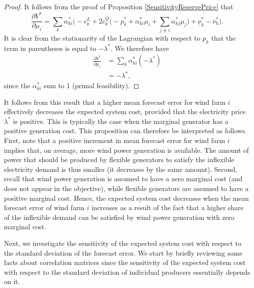 \documentclass{article}
\begin{document}
\begin{proof}
It follows from the proof of Proposition \ref{SensitivityReservePrice} that 
\begin{equation*}
\frac{\partial V^*}{\partial \mu_i} = \sum_k \alpha_{ki}^* \Big(-c_k^L + 2 c_k^Q \big(- p_k^* + \alpha_{ki}^* \mu_i + \sum_{j \ne i} \alpha_{kj}^* \mu_j\big) + \underline{\nu}_k^* - \overline{\nu}_k^*\Big).
\end{equation*}
It is clear from the stationarity of the Lagrangian with respect to $p_k$ that the term in parentheses is equal to $-\lambda^*$. We therefore have
\begin{align*}
\frac{\partial V^*}{\partial \mu_i} &= \sum_k \alpha_{ki}^* (-\lambda^*)\\
&= -\lambda^*,
\end{align*}
since the $\alpha_{ki}^*$ sum to 1 (primal feasibility).
\end{proof}

It follows from this result that a higher mean forecast error for wind farm $i$ effectively decreases the expected system cost, provided that the electricity price $\lambda^*$ is positive. This is typically the case when the marginal generator has a positive generation cost. This proposition can therefore be interpreted as follows. First, note that a positive increment in mean forecast error for wind farm $i$ implies that, on average, more wind power generation is available. The amount of power that should be produced by flexible generators to satisfy the inflexible electricity demand is thus smaller (it decreases by the same amount). Second, recall that wind power generation is assumed to have a zero marginal cost (and does not appear in the objective), while flexible generators are assumed to have a positive marginal cost. Hence, the expected system cost decreases when the mean forecast error of wind farm $i$ increases as a result of the fact that a higher share of the inflexible demand can be satisfied by wind power generation with zero marginal cost.

Next, we investigate the sensitivity of the expected system cost with respect to the standard deviation of the forecast error. We start by briefly reviewing some facts about correlation matrices since the sensitivity of the expected system cost with respect to the standard deviation of individual producers essentially depends on it.
\end{document}
